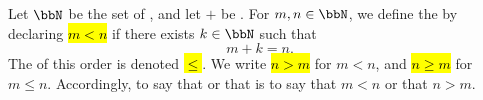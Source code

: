 \begin{definition} \label{definition:standard_order_on_natural_numbers}
Let $\bbN$ be the set of , and let $+$ be . For $m, n \in \bbN$, we define the  by declaring \hl{$m < n$} if there exists $k \in \bbN$ such that
$$m + k = n.$$
The  of this order is denoted \hl{$\leq$}. We write \hl{$n > m$} for $m < n$, and \hl{$n \geq m$} for $m \leq n$. Accordingly, to say that  or that  is to say that $m < n$ or that $n > m$.
\end{definition}